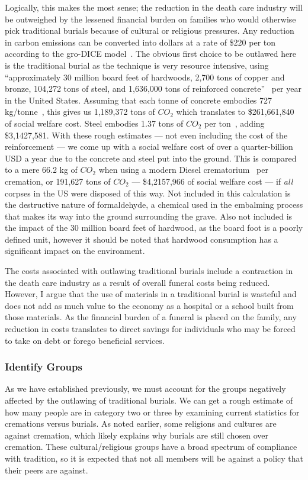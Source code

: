 \documentclass[a4paper,12pt]{article}
\begin{document}
Logically, this makes the most sense; the reduction in the death care industry will be outweighed by the lessened financial burden on families who would otherwise pick traditional burials because of cultural or religious pressures.
Any reduction in carbon emissions can be converted into dollars at a rate of \$220 per ton according to the gro-DICE model~\cite{moore2015temperature}.
The obvious first choice to be outlawed here is the traditional burial as the technique is very resource intensive, using ``approximately 30 million board feet of hardwoods, 2,700 tons of copper and bronze, 104,272 tons of steel, and 1,636,000 tons of reinforced concrete''~\cite{harker_2012} per year in the United States.
Assuming that each tonne of concrete embodies 727 kg/tonne~\cite{susconcrete}, this gives us 1,189,372 tons of $CO_2$ which translates to \$261,661,840 of social welfare cost.
Steel embodies 1.37 tons of $CO_2$ per ton~\cite{embodiedco2}, adding \$3,1427,581.
With these rough estimates --- not even including the cost of the reinforcement --- we come up with a social welfare cost of over a quarter-billion USD a year due to the concrete and steel put into the ground.
This is compared to a mere 66.2 kg of $CO_2$ when using a modern Diesel crematorium~\cite{biomassgas} per cremation, or 191,627 tons of $CO_2$ --- \$4,2157,966 of social welfare cost --- if \textit{all} corpses in the US were disposed of this way.
Not included in this calculation is the destructive nature of formaldehyde, a chemical used in the embalming process that makes its way into the ground surrounding the grave.
Also not included is the impact of the 30 million board feet of hardwood, as the board foot is a poorly defined unit, however it should be noted that hardwood consumption has a significant impact on the environment.

The costs associated with outlawing traditional burials include a contraction in the death care industry as a result of overall funeral costs being reduced.
However, I argue that the use of materials in a traditional burial is wasteful and does not add as much value to the economy as a hospital or a school built from those materials.
As the financial burden of a funeral is placed on the family, any reduction in costs translates to direct savings for individuals who may be forced to take on debt or forego beneficial services.

\subsubsection{Identify Groups}
As we have established previously, we must account for the groups negatively affected by the outlawing of traditional burials.
We can get a rough estimate of how many people are in category two or three by examining current statistics for cremations versus burials.
As noted earlier, some religions and cultures are against cremation, which likely explains why burials are still chosen over cremation.
These cultural/religious groups have a broad spectrum of compliance with tradition, so it is expected that not all members will be against a policy that their peers are against.
\end{document}
